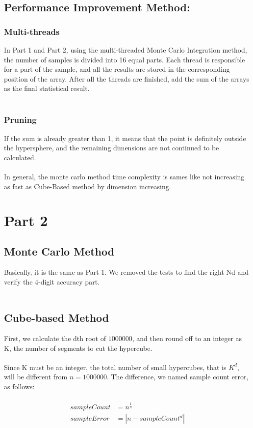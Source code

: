\documentclass{article}
\begin{document}
		\subsection*{Performance Improvement Method:}
		\subsubsection*{Multi-threads}
		In Part 1 and Part 2, using the multi-threaded Monte Carlo Integration method, the number of samples is divided into 16 equal parts. Each thread is responsible for a part of the sample, and all the results are stored in the corresponding position of the array. After all the threads are finished, add the sum of the arrays as the final statistical result.
		\\
		\\
		\subsubsection*{Pruning}
		If the sum is already greater than 1, it means that the point is definitely outside the hypersphere, and the remaining dimensions are not continued to be calculated.
		\\
		\\
		In general, the monte carlo method time complexity is sames like not increasing as fast as Cube-Based method by dimension increasing.
	\section*{Part 2}
	\label{sec:p2}
		\subsection*{Monte Carlo Method}
		Basically, it is the same as Part 1. We removed the tests to find the right Nd and verify the 4-digit accuracy part.
		\\
		\\
		\subsection*{Cube-based Method}
		First, we calculate the dth root of $1000000$, and then round off to an integer as K, the number of segments to cut the hypercube.
		\\
		\\
		Since K must be an integer, the total number of small hypercubes, that is $K^d$, will be different from $n=1000000$. The difference, we named sample count error, as follows:
		\\
		\\
		\begin{equation*}
		\begin{split}
			sampleCount &= n ^ {\frac{1}{d}}\\
			sampleError &= |n - sampleCount^d|
		\end{split}
		\end{equation*}
		\\
		\\
\end{document}
